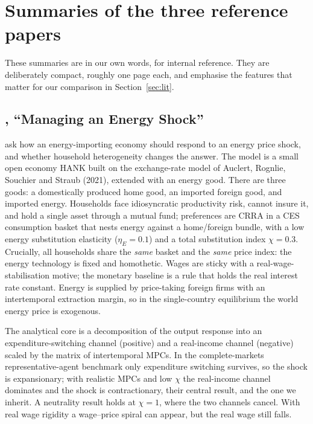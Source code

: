 \section{Summaries of the three reference papers}\label{app:summaries}
\label{sec:summaries}

These summaries are in our own words, for internal reference. They are
deliberately compact, roughly one page each, and emphasise the features that
matter for our comparison in Section~\ref{sec:lit}.

\subsection{\citet{ARS2024}, ``Managing an Energy Shock''}

\citet{ARS2024} ask how an energy-importing economy should respond to an energy
price shock, and whether household heterogeneity changes the answer. The model
is a small open economy HANK built on the exchange-rate model of Auclert,
Rognlie, Souchier and Straub (2021), extended with an energy good. There are
three goods: a domestically produced home good, an imported foreign good, and
imported energy. Households face idiosyncratic productivity risk, cannot insure
it, and hold a single asset through a mutual fund; preferences are CRRA in a
CES consumption basket that nests energy against a home/foreign bundle, with a
low energy substitution elasticity ($\eta_E=0.1$) and a total substitution
index $\chi=0.3$. Crucially, all households share the \emph{same} basket and
the \emph{same} price index: the energy technology is fixed and homothetic.
Wages are sticky with a real-wage-stabilisation motive; the monetary baseline
is a rule that holds the real interest rate constant. Energy is supplied by
price-taking foreign firms with an intertemporal extraction margin, so in the
single-country equilibrium the world energy price is exogenous.

The analytical core is a decomposition of the output response into an
expenditure-switching channel (positive) and a real-income channel (negative)
scaled by the matrix of intertemporal MPCs. In the complete-markets
representative-agent benchmark only expenditure switching survives, so the
shock is expansionary; with realistic MPCs and low $\chi$ the real-income
channel dominates and the shock is contractionary, their central result, and
the one we inherit. A neutrality result holds at $\chi=1$, where the two
channels cancel. With real wage rigidity a wage--price spiral can appear, but
the real wage still falls.

